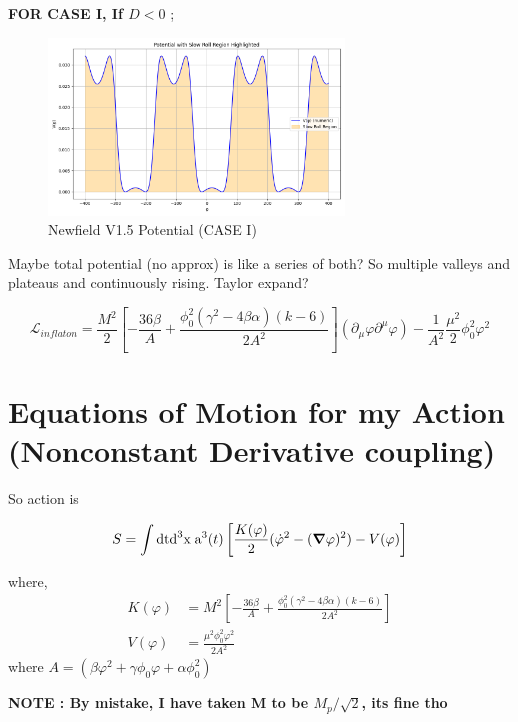 \documentclass{article}
\begin{document}
\textbf{FOR CASE I, If $D < 0$ };
\begin{figure}[h!]
    \centering
    \includegraphics[width=0.7\textwidth]{Python/Figures/New Potenial CASE I with gravity.png}
    \caption{Newfield V1.5 Potential (CASE I)}
    \label{Newfield V1.5 as func of N}
\end{figure}

Maybe total potential (no approx) is like a series of both? So multiple valleys and plateaus and continuously rising. Taylor expand?

\begin{equation}
    \mathcal{L}_{inflaton} = \frac{M^2}{2} \left[-\frac{36\beta}{A} + \frac{\phi_0^2 (\gamma^2 - 4\beta\alpha)(k-6)}{2 A^2}\right] (\partial_\mu \varphi \partial^\mu \varphi) -  \frac{1}{A^2} \frac{\mu^2}{2} \phi^2_0 \varphi^2 
\end{equation}

\section{Equations of Motion for my Action (Nonconstant Derivative coupling)}

So action is

\begin{equation} \label{44}
    S = \int \text{dt}\text{d}^3\text{x} \; \text{a}^3(t) \left[ \frac{K(\varphi)}{2}(\dot{\varphi}^2 - (\grad \varphi)^2) - V(\varphi) \right]
\end{equation}

where,
\begin{align}
    K(\varphi) &= M^2 \left[-\frac{36\beta}{A} + \frac{\phi_0^2 (\gamma^2 - 4\beta\alpha)(k-6)}{2 A^2}\right] \nonumber \\
    V(\varphi) &=  \frac{\mu^2 \phi_0^2 \varphi^2}{2 A^2}
\end{align}
where $A = (\beta \varphi^2  +\gamma \phi_0 \varphi +\alpha \phi^2_0)$

\textbf{NOTE : By mistake, I have taken M to be $M_p/\sqrt{2}$, its fine tho}
\end{document}
